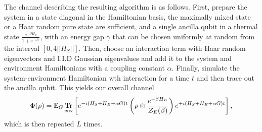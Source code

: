 \documentclass[11pt]{article}
\newcommand{\brackets}[1]{\left[ #1 \right]}
\newcommand{\norm}[1]{\left|\left| #1 \right|\right|}
\DeclareMathOperator{\Tr}{Tr}
\newcommand{\partrace}[2]{\Tr_{#1} \brackets{ #2 }}
\newcommand{\partfun}{\mathcal{Z}}
\begin{document}
The channel describing the resulting algorithm is as follows. First, prepare the system in a state diagonal in the Hamiltonian basis, the maximally mixed state or a Haar random pure state are sufficient, and a single ancilla qubit in a thermal state $\frac{e^{-\beta H_E}}{1 + e^{-\beta \gamma}}$, with an energy gap $\gamma$ that can be chosen uniformly at random from the interval $[0, 4\norm{H_S}]$. Then, choose an interaction term with Haar random eigenvectors and I.I.D Gaussian eigenvalues and add it to the system and environment Hamiltonians with a coupling constant $\alpha$. Finally, simulate the system-environment Hamiltonian wth interaction for a time $t$ and then trace out the ancilla qubit. This yields our overall channel
\begin{equation}
    \Phi(\rho) = \mathbb{E}_G \partrace{\rm env}{e^{-i(H_S + H_E + \alpha G) t} \left( \rho \otimes \frac{e^{-\beta H_E}}{\partfun_E(\beta)} \right) e^{+i(H_S + H_E + \alpha G) t} }, \label{eq:phi}
\end{equation}
which is then repeated $L$ times.
\end{document}
